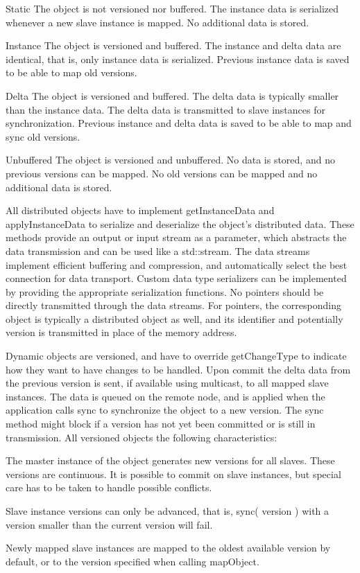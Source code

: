 \documentclass[10pt,journal,compsoc]{IEEEtran}
\begin{document}
\begin{compactdesc}
\item[Static] The object is not versioned nor buffered. The instance data is
  serialized whenever a new slave instance is mapped. No additional data is
  stored.
\item[Instance] The object is versioned and buffered. The instance and delta
  data are identical, that is, only instance data is serialized. Previous
  instance data is saved to be able to map old versions.
\item[Delta] The object is versioned and buffered. The delta data is typically
  smaller than the instance data. The delta data is transmitted to slave
  instances for synchronization. Previous instance and delta data is saved to be
  able to map and sync old versions.
\item[Unbuffered] The object is versioned and unbuffered. No data is stored, and
  no previous versions can be mapped. No old versions can be mapped and no
  additional data is stored.
\end{compactdesc}

All distributed objects have to implement \textsf{getInstanceData} and
\textsf{applyInstanceData} to serialize and deserialize the object's distributed
data. These methods provide an output or input stream as a parameter, which
abstracts the data transmission and can be used like a \textsf{std::stream}. The
data streams implement efficient buffering and compression, and automatically
select the best connection for data transport. Custom data type serializers can
be implemented by providing the appropriate serialization functions. No pointers
should be directly transmitted through the data streams. For pointers, the
corresponding object is typically a distributed object as well, and its
identifier and potentially version is transmitted in place of the memory
address.

Dynamic objects are versioned, and have to override \textsf{getChangeType} to
indicate how they want to have changes to be handled. Upon \textsf{commit} the
delta data from the previous version is sent, if available using multicast, to
all mapped slave instances. The data is queued on the remote node, and is
applied when the application calls \textsf{sync} to synchronize the object to a
new version. The \textsf{sync} method might block if a version has not yet been
committed or is still in transmission. All versioned objects the following
characteristics:

\begin{compactitem}
\item The master instance of the object generates new versions for all
  slaves. These versions are continuous. It is possible to commit on slave
  instances, but special care has to be taken to handle possible
  conflicts.
\item Slave instance versions can only be advanced, that is, \textsf{sync(
  version )} with a version smaller than the current version will fail.
\item Newly mapped slave instances are mapped to the oldest available
  version by default, or to the version specified when calling
  \textsf{mapObject}.
\end{compactitem}
\end{document}
